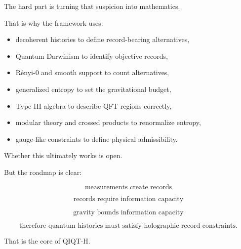 \documentclass[11pt,a4paper]{article}
\begin{document}
The hard part is turning that suspicion into mathematics.

That is why the framework uses:

\begin{itemize}
  \item decoherent histories to define record-bearing alternatives,
  \item Quantum Darwinism to identify objective records,
  \item Rényi-0 and smooth support to count alternatives,
  \item generalized entropy to set the gravitational budget,
  \item Type III algebra to describe QFT regions correctly,
  \item modular theory and crossed products to renormalize entropy,
  \item gauge-like constraints to define physical admissibility.
\end{itemize}

Whether this ultimately works is open.

But the roadmap is clear:

\[
\text{measurements create records}
\]

\[
\text{records require information capacity}
\]

\[
\text{gravity bounds information capacity}
\]

\[
\text{therefore quantum histories must satisfy holographic record constraints}.
\]

That is the core of QIQT-H.
\end{document}
